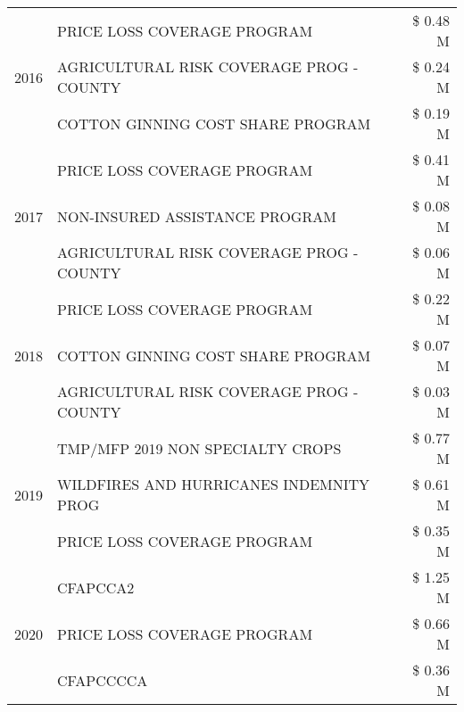 \begin{tabular}{llr}
\cline{1-3}
\multirow[t]{3}{*}{2016} & PRICE LOSS COVERAGE PROGRAM & \$ 0.48 M \\
 & AGRICULTURAL RISK COVERAGE PROG - COUNTY & \$ 0.24 M \\
 & COTTON GINNING COST SHARE PROGRAM & \$ 0.19 M \\
\cline{1-3}
\multirow[t]{3}{*}{2017} & PRICE LOSS COVERAGE PROGRAM & \$ 0.41 M \\
 & NON-INSURED ASSISTANCE PROGRAM & \$ 0.08 M \\
 & AGRICULTURAL RISK COVERAGE PROG - COUNTY & \$ 0.06 M \\
\cline{1-3}
\multirow[t]{3}{*}{2018} & PRICE LOSS COVERAGE PROGRAM & \$ 0.22 M \\
 & COTTON GINNING COST SHARE PROGRAM & \$ 0.07 M \\
 & AGRICULTURAL RISK COVERAGE PROG - COUNTY & \$ 0.03 M \\
\cline{1-3}
\multirow[t]{3}{*}{2019} & TMP/MFP 2019 NON SPECIALTY CROPS & \$ 0.77 M \\
 & WILDFIRES AND HURRICANES INDEMNITY PROG & \$ 0.61 M \\
 & PRICE LOSS COVERAGE PROGRAM & \$ 0.35 M \\
\cline{1-3}
\multirow[t]{3}{*}{2020} & CFAPCCA2 & \$ 1.25 M \\
 & PRICE LOSS COVERAGE PROGRAM & \$ 0.66 M \\
 & CFAPCCCCA & \$ 0.36 M \\
\cline{1-3}
\bottomrule
\end{tabular}
